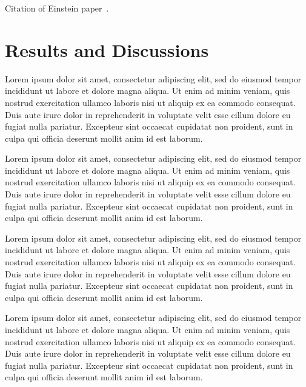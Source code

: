 \documentclass{acm_proc_article-sp}
\begin{document}
Citation of Einstein paper~\cite{Einstein}.

\section{Results and Discussions}
Lorem ipsum dolor sit amet, consectetur adipiscing elit, sed do eiusmod tempor incididunt ut labore et dolore magna aliqua. Ut enim ad minim veniam, quis nostrud exercitation ullamco laboris nisi ut aliquip ex ea commodo consequat. Duis aute irure dolor in reprehenderit in voluptate velit esse cillum dolore eu fugiat nulla pariatur. Excepteur sint occaecat cupidatat non proident, sunt in culpa qui officia deserunt mollit anim id est laborum.

Lorem ipsum dolor sit amet, consectetur adipiscing elit, sed do eiusmod tempor incididunt ut labore et dolore magna aliqua. Ut enim ad minim veniam, quis nostrud exercitation ullamco laboris nisi ut aliquip ex ea commodo consequat. Duis aute irure dolor in reprehenderit in voluptate velit esse cillum dolore eu fugiat nulla pariatur. Excepteur sint occaecat cupidatat non proident, sunt in culpa qui officia deserunt mollit anim id est laborum.

Lorem ipsum dolor sit amet, consectetur adipiscing elit, sed do eiusmod tempor incididunt ut labore et dolore magna aliqua. Ut enim ad minim veniam, quis nostrud exercitation ullamco laboris nisi ut aliquip ex ea commodo consequat. Duis aute irure dolor in reprehenderit in voluptate velit esse cillum dolore eu fugiat nulla pariatur. Excepteur sint occaecat cupidatat non proident, sunt in culpa qui officia deserunt mollit anim id est laborum.

Lorem ipsum dolor sit amet, consectetur adipiscing elit, sed do eiusmod tempor incididunt ut labore et dolore magna aliqua. Ut enim ad minim veniam, quis nostrud exercitation ullamco laboris nisi ut aliquip ex ea commodo consequat. Duis aute irure dolor in reprehenderit in voluptate velit esse cillum dolore eu fugiat nulla pariatur. Excepteur sint occaecat cupidatat non proident, sunt in culpa qui officia deserunt mollit anim id est laborum.




\end{document}
